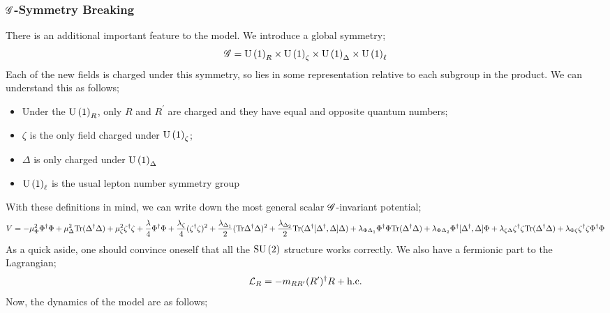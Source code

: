 \documentclass[10pt]{article}
\begin{document}
\subsubsection{$\mathscr{G}$-Symmetry Breaking}
There is an additional important feature to the model. We introduce a global symmetry;
\begin{equation}
  \mathscr{G} = \textrm{U}\left(1\right)_R \times \textrm{U}\left(1\right)_\zeta \times \textrm{U}\left(1\right)_\Delta \times \textrm{U}\left(1\right)_\ell
\end{equation}
Each of the new fields is charged under this symmetry, so lies in some representation relative to each subgroup in the product. We can understand this as follows;
\begin{itemize}
  \item Under the $\textrm{U}\left(1\right)_R$, only $R$ and $R^\prime$ are charged and they have equal and opposite quantum numbers;
  \item $\zeta$ is the only field charged under $\textrm{U}\left(1\right)_\zeta$;
  \item $\Delta$ is only charged under $\textrm{U}\left(1\right)_\Delta$
  \item $\textrm{U}\left(1\right)_\ell$ is the usual lepton number symmetry group
\end{itemize}
With these definitions in mind, we can write down the most general scalar $\mathscr{G}$-invariant potential;
\begin{dmath}
  V = -\mu_\Phi^2 \Phi\dagg\Phi + \mu_\Delta^2 \tr(\Delta\dagg\Delta) + \mu_\zeta^2 \zeta\dagg\zeta + \frac{\lambda}{4}\Phi\dagg\Phi + \frac{\lambda_\zeta}{4}(\zeta\dagg\zeta)^2 + \frac{\lambda_{\Delta_1}}{2}(\tr\Delta\dagg\Delta)^2 + \frac{\lambda_{\Delta_2}}{2}\tr(\Delta\dagg[\Delta\dagg,\Delta]\Delta) + \lambda_{\Phi \Delta_1}\Phi\dagg\Phi \tr(\Delta\dagg\Delta) + \lambda_{\Phi\Delta_2}\Phi\dagg [\Delta\dagg,\Delta]\Phi + \lambda_{\zeta\Delta}\zeta\dagg \zeta \tr(\Delta\dagg\Delta) + \lambda_{\Phi\zeta}\zeta\dagg\zeta \Phi\dagg\Phi
\end{dmath}
As a quick aside, one should convince oneself that all the $\textrm{SU}\left(2\right)$ structure works correctly. We also have a fermionic part to the Lagrangian;
\begin{equation}
  \mathcal{L}_{R} = -m_{RR^\prime}(R^\prime)^{\dagger} R + \text{h.c.}
\end{equation}
Now, the dynamics of the model are as follows;
\end{document}
